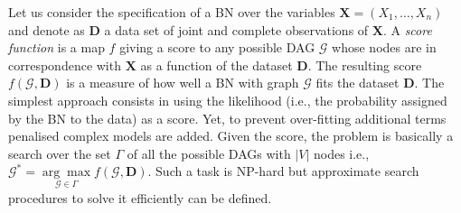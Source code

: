 Let us consider the specification of a BN over the variables $\boldsymbol{X}=(X_1,\ldots,X_n)$ and denote as $\boldsymbol{D}$ a data set of joint and complete observations of $\boldsymbol{X}$. 
A \textit{score function} is a map $f$ giving a score to any possible DAG $\mathcal{G}$ whose nodes are in correspondence with $\boldsymbol{X}$ as a function of the dataset $\boldsymbol{D}$. 
The resulting score $f(\mathcal{G},\boldsymbol{D})$ is a measure of how well a BN with graph $\mathcal{G}$ fits the dataset $\boldsymbol{D}$.
The simplest approach consists in using the likelihood (i.e., the probability assigned by the BN to the data) as a score. 
Yet, to prevent over-fitting additional terms penalised complex models are added.
Given the score, the problem is basically a search over the set $\Gamma$ of all the possible DAGs with $|V|$ nodes i.e., $\mathcal{G}^* = \underset{\mathcal{G} \in \Gamma}{\arg\max} f(\mathcal{G},\boldsymbol{D})$. 
Such a task is NP-hard but approximate search procedures to solve it efficiently can be defined.

